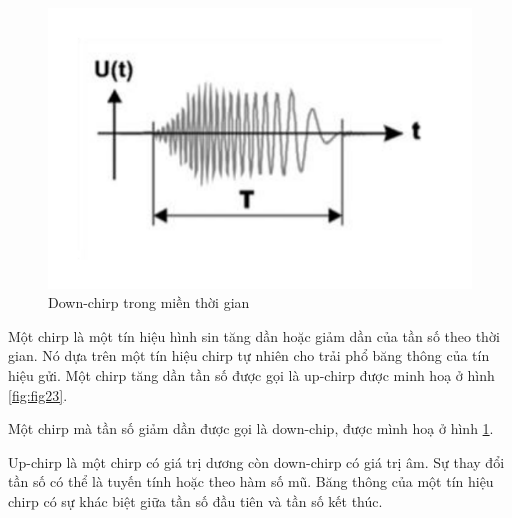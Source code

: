 	\begin{figure}[h!] %
			\centering
			\includegraphics[width=0.5\linewidth]{./img/24.pdf}
			\caption{Down-chirp trong miền thời gian}
			\label{fig:fig24}
	\end{figure}
Một chirp là một tín hiệu hình sin tăng dần hoặc giảm dần của tần số theo thời gian. Nó dựa trên một tín hiệu chirp tự nhiên cho trải phổ băng thông của tín hiệu gửi. Một chirp tăng dần tần số được gọi là up-chirp được minh hoạ ở hình \ref{fig:fig23}. \par
Một chirp mà tần số giảm dần được gọi là down-chip, được mình hoạ ở hình \ref{fig:fig24}. \par 
Up-chirp là một chirp có giá trị dương còn down-chirp có giá trị âm. Sự thay đổi tần số có thể là tuyến tính hoặc theo hàm số mũ. Băng thông của một tín hiệu chirp có sự khác biệt giữa tần số đầu tiên và tần số kết thúc. 

